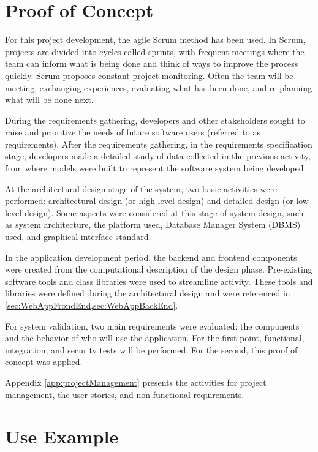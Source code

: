
\acresetall 

\section{Proof of Concept}\label{sec:method}

For this project development, the agile Scrum method has been used. In Scrum, projects are divided into cycles called sprints, with frequent meetings where the team can inform what is being done and think of ways to improve the process quickly. Scrum proposes constant project monitoring. Often the team will be meeting, exchanging experiences, evaluating what has been done, and re-planning what will be done next.

During the requirements gathering, developers and other stakeholders sought to raise and prioritize the needs of future software users (referred to as requirements). After the requirements gathering, in the requirements specification stage, developers made a detailed study of data collected in the previous activity, from where models were built to represent the software system being developed.

At the architectural design stage of the system, two basic activities were performed: architectural design (or high-level design) and detailed design (or low-level design). Some aspects were considered at this stage of system design, such as system architecture, the platform used, Database Manager System (DBMS) used, and graphical interface standard.

In the application development period, the backend and frontend components were created from the computational description of the design phase. Pre-existing software tools and class libraries were used to streamline activity. These tools and libraries were defined during the architectural design and were referenced in \cref{sec:WebAppFrondEnd,sec:WebAppBackEnd}.

For system validation, two main requirements were evaluated: the components and the behavior of who will use the application. For the first point, functional, integration, and security tests will be performed. For the second, this proof of concept was applied.

Appendix \ref{app:projectManagement} presents the activities for project management, the user stories, and non-functional requirements. 


\section{Use Example}\label{sec:workflow}

